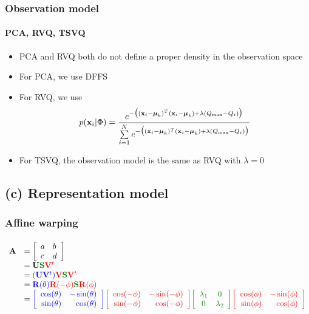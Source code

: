 \begin{frame}
\frametitle{Observation model}
\framesubtitle{PCA, RVQ, TSVQ}
\logoCSIPCPL\mypagenum
\begin{itemize}
\item PCA and RVQ both do not define a proper density in the observation space
\item For PCA, we use DFFS
\item For RVQ, we use
\begin{equation}
p(\mathbf{x}_i|\Phi) = \frac{e^{-\big((\mathbf{x}_i-\boldsymbol\mu_k)^T(\mathbf{x}_i-\boldsymbol\mu_k) + \lambda({Q_{\textrm{max}}-Q_i})\big)}} {\sum\limits_{i=1}^N e^{-\big((\mathbf{x}_i-\boldsymbol\mu_k)^T(\mathbf{x}_i-\boldsymbol\mu_k) + \lambda({Q_{\textrm{max}}-Q_i})\big)}}
\end{equation}
\item For TSVQ, the observation model is the same as RVQ with $\lambda=0$
\end{itemize}
\end{frame}


\subsection{(c) Representation model}
\begin{frame}[plain]
\frametitle{Affine warping}
\framesubtitle{}
\logoCSIPCPL\mypagenum
\scriptsize
\begin{changemargin}{-1.3in}{0in}
\begin{equation}
\begin{array}{llllllll}
\mathbf{A} &= \left[\begin{array}{lll}a & b \\ c & d\\ \end{array}\right] \\
&=\mathbf{U}{\color{darkgreen}\mathbf{S}}{\color{red}\mathbf{V}^t} \\
&={\color{blue}(\mathbf{U}\mathbf{V}^t)}{\color{red}\mathbf{V}}{\color{darkgreen}\mathbf{S}}{\color{red}\mathbf{V}^t}\\
&={\color{blue}\mathbf{R}(\theta)}{\color{red}\mathbf{R}(-\phi)}{\color{darkgreen}\mathbf{S}}{\color{red}\mathbf{R} (\phi)}\\
&={\color{blue}\RotMatrixTheta}{\color{red}\RotMatrixminusPhi}{\color{darkgreen}\EigenvalueMatrix}{\color{red}\RotMatrixPhi}\\\\
\end{array}
\label{Eq:AffineDecomposition}
\end{equation}
\end{changemargin}
\end{frame}



